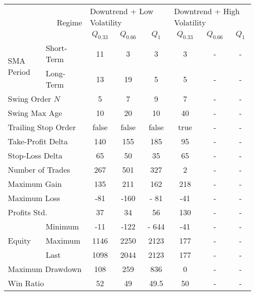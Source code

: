 \centering
\begin{tabular}{ll|cccccc}
    \toprule
    \multicolumn{2}{r|}{\multirow{2}{*}{Regime}} & \multicolumn{3}{l}{Downtrend + Low Volatility}   & \multicolumn{3}{l}{Downtrend + High Volatility}   \\
    \multicolumn{2}{r|}{} & $Q_{0.33}$ & $Q_{0.66}$ & $Q_{1}$ & $Q_{0.33}$ & $Q_{0.66}$ & $Q_{1}$ \\
    \midrule
    \multirow{2}{*}{SMA Period}            & Short-Term & 11   & 3    & 3     & 3   & - & - \\
    & Long-Term  & 13   & 19   & 5     & 5   & - & - \\
    \multicolumn{2}{l|}{Swing Order $N$} & 5 & 7 & 9 & 7 & - & - \\
    \multicolumn{2}{l|}{Swing Max Age} & 10 & 20 & 10 & 40 & - & - \\
    \multicolumn{2}{l|}{Trailing Stop Order} & false & false & false & true & - & - \\
    \multicolumn{2}{l|}{Take-Profit Delta} & 140 & 155 & 185 & 95 & - & - \\
    \multicolumn{2}{l|}{Stop-Loss Delta} & 65 & 50 & 35 & 65 & - & - \\
    \midrule
    \multicolumn{2}{l|}{Number of Trades} & 267 & 501 & 327 & 2 & - & - \\
    \multicolumn{2}{l|}{Maximum Gain} & 135 & 211 & 162 & 218 & - & - \\
    \multicolumn{2}{l|}{Maximum Loss} & -81 & -160 & - 81 & -41 & - & - \\
    \multicolumn{2}{l|}{Profits Std.} & 37 & 34 & 56 & 130 & - & - \\
    \multirow{3}{*}{Equity}                & Minimum    & -11  & -122 & - 644 & -41 & - & - \\
    & Maximum    & 1146 & 2250 & 2123  & 177 & - & - \\
    & Last       & 1098 & 2044 & 2123  & 177 & - & - \\
    \multicolumn{2}{l|}{Maximum Drawdown} & 108 & 259 & 836 & 0 & - & - \\
    \multicolumn{2}{l|}{Win Ratio} & 52 & 49 & 49.5 & 50 & - & - \\
    \bottomrule
\end{tabular}